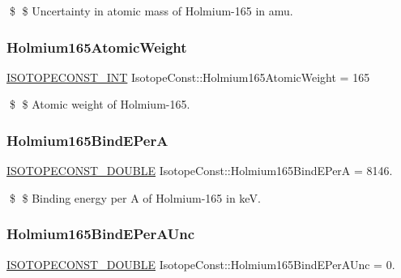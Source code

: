 \$ \$ Uncertainty in atomic mass of Holmium-\/165 in amu. \mbox{\label{group___isotope_const-_holmium-_ho165_ga98c6e334e273e85479f6468a78da13d0}} 
\subsubsection{\texorpdfstring{Holmium165\+Atomic\+Weight}{Holmium165AtomicWeight}}
{\footnotesize\ttfamily \mbox{\hyperlink{group___isotope_const-_macros_ga5f18360b3e99483a35c32d789e62621c}{I\+S\+O\+T\+O\+P\+E\+C\+O\+N\+S\+T\+\_\+\+I\+NT}} Isotope\+Const\+::\+Holmium165\+Atomic\+Weight = 165}

\$ \$ Atomic weight of Holmium-\/165. \mbox{\label{group___isotope_const-_holmium-_ho165_gad01fb3934938ba5929592fb6c680faa7}} 
\subsubsection{\texorpdfstring{Holmium165\+Bind\+E\+PerA}{Holmium165BindEPerA}}
{\footnotesize\ttfamily \mbox{\hyperlink{group___isotope_const-_macros_ga8f45a7272ce02c0b4c65c44636ed719a}{I\+S\+O\+T\+O\+P\+E\+C\+O\+N\+S\+T\+\_\+\+D\+O\+U\+B\+LE}} Isotope\+Const\+::\+Holmium165\+Bind\+E\+PerA = 8146.}

\$ \$ Binding energy per A of Holmium-\/165 in keV. \mbox{\label{group___isotope_const-_holmium-_ho165_gab81d74f96ce72d8c0e290875920bfd23}} 
\subsubsection{\texorpdfstring{Holmium165\+Bind\+E\+Per\+A\+Unc}{Holmium165BindEPerAUnc}}
{\footnotesize\ttfamily \mbox{\hyperlink{group___isotope_const-_macros_ga8f45a7272ce02c0b4c65c44636ed719a}{I\+S\+O\+T\+O\+P\+E\+C\+O\+N\+S\+T\+\_\+\+D\+O\+U\+B\+LE}} Isotope\+Const\+::\+Holmium165\+Bind\+E\+Per\+A\+Unc = 0.}

